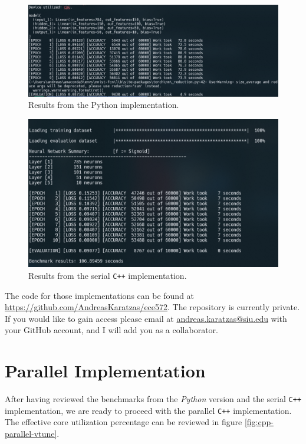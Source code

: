 \begin{figure}[!htbp]
\centering
\includegraphics[width=\linewidth]{static/figures/python.PNG}
\caption{Results from the Python implementation.}
\label{fig:python}
\end{figure}

\begin{figure}[!htbp]
\centering
\includegraphics[width=\linewidth]{static/figures/cpp-serial.PNG}
\caption{Results from the serial \texttt{C++} implementation.}
\label{fig:cpp-serial}
\end{figure}

The code for those implementations can be found at \url{https://github.com/AndreasKaratzas/ece572}. The repository is currently private. If you would like to gain access please email at \href{mailto:andreas.karatzas@siu.edu}{andreas.karatzas@siu.edu} with your GitHub account, and I will add you as a collaborator.

\section{Parallel Implementation}

After having reviewed the benchmarks from the \textit{Python} version and the serial \texttt{C++} implementation, we are ready to proceed with the parallel \texttt{C++} implementation. The effective core utilization percentage can be reviewed in figure \ref{fig:cpp-parallel-vtune}.

